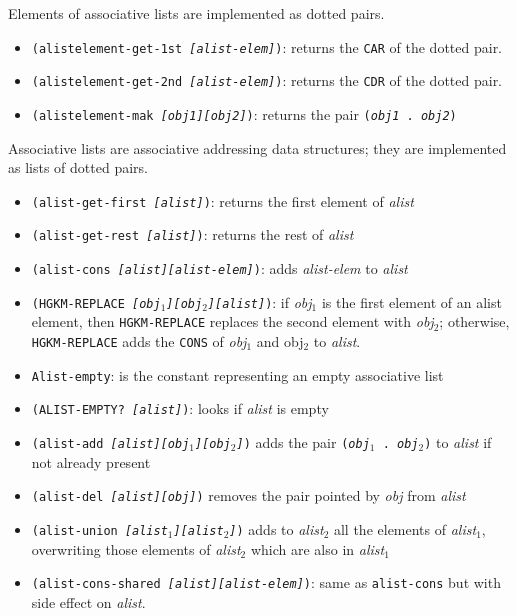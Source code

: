 Elements of associative lists are implemented as dotted pairs.
%
\begin{itemize}
    \item {\tt (alistelement-get-1st {\it [alist-elem]})}:
        returns the {\tt CAR} of the dotted pair.
    \item {\tt (alistelement-get-2nd {\it [alist-elem]})}:
         returns the {\tt CDR} of the dotted pair.
    \item {\tt (alistelement-mak {\it [obj1][obj2]})}:
        returns the pair {\tt ({\it obj1} . {\it obj2})}
\end{itemize}
%
Associative lists are associative addressing data structures; they are
implemented as lists of dotted pairs.
%
\begin{itemize}
    \item {\tt (alist-get-first {\it [alist]})}:
         returns the first element of {\it alist}
    \item {\tt (alist-get-rest {\it [alist]})}:
         returns the rest of {\it alist} 
    \item {\tt (alist-cons {\it [alist][alist-elem]})}:
         adds {\it alist-elem} to {\it alist}
    \item {\tt (HGKM-REPLACE {\it [obj$_1$][obj$_2$][alist]})}:
        if {\it obj$_1$} is the first element of an alist element, then
		{\tt HGKM-REPLACE} replaces the second element with  {\it obj$_2$};
        otherwise, {\tt HGKM-REPLACE} adds the {\tt CONS} of {\it obj$_1$} 
        and obj$_2$ to {\it alist}.
    \item {\tt Alist-empty}:
        is the constant representing an empty associative list
    \item {\tt (ALIST-EMPTY? {\it [alist]})}:
        looks if {\it alist} is empty
    \item {\tt (alist-add {\it [alist][obj$_1$][obj$_2$]})}
        adds the pair {\tt ({\it obj$_1$} . {\it obj$_2$})} to {\it alist}
        if not already present
    \item {\tt (alist-del {\it [alist][obj]})}
        removes the pair pointed by {\it obj} from {\it alist}
    \item {\tt (alist-union {\it [alist$_1$][alist$_2$]})}
        adds to {\it alist$_2$} all the elements of {\it alist$_1$},
        overwriting those elements of {\it alist$_2$} which are also in
		{\it alist$_1$} 
    \item {\tt (alist-cons-shared {\it [alist][alist-elem]})}:
        same as {\tt alist-cons} but with side effect on {\it alist}.
\end{itemize}


